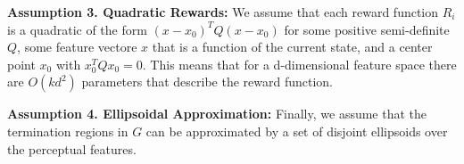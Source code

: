 \vspace{0.5em}\noindent\textbf{Assumption 3. Quadratic Rewards: } We assume that each reward function $R_i$ is a quadratic of the form $(x-x_0)^T Q (x - x_0)$ for some positive semi-definite $Q$, some feature vectore $x$ that is a function of the current state, and a center point $x_0$ with $x_0^T Q x_0 = 0$. This means that for a d-dimensional feature space there are $O(kd^2)$ parameters that describe the reward function.


\vspace{0.5em}\noindent\textbf{Assumption 4. Ellipsoidal Approximation: } Finally, we assume that the termination regions in $G$ can be approximated by a set of disjoint ellipsoids over the perceptual features.










